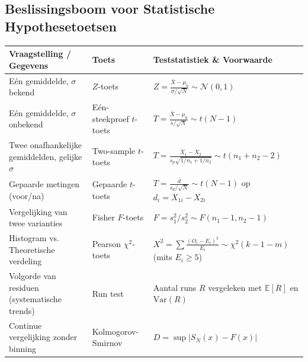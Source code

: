 \documentclass[11pt,a4paper]{article}
\newcommand{\E}{\mathbb{E}}
\newcommand{\Var}{\text{Var}}
\newcommand{\normdist}{\mathcal{N}}
\begin{document}
\subsection{Beslissingsboom voor Statistische Hypothesetoetsen}
\begin{table}[H]
    \centering
    \small
    \begin{tabularx}{\textwidth}{llX}
        \toprule
        \textbf{Vraagstelling / Gegevens} & \textbf{Toets} & \textbf{Teststatistiek \& Voorwaarde} \\
        \midrule
        Eén gemiddelde, $\sigma$ bekend & $Z$-toets & $Z = \frac{\bar{X} - \mu_0}{\sigma / \sqrt{N}} \sim \normdist(0,1)$ \\
        \addlinespace
        Eén gemiddelde, $\sigma$ onbekend & Eén-steekproef $t$-toets & $T = \frac{\bar{X} - \mu_0}{s / \sqrt{N}} \sim t(N-1)$ \\
        \addlinespace
        Twee onafhankelijke gemiddelden, gelijke $\sigma$ & Two-sample $t$-toets & $T = \frac{\bar{X}_1 - \bar{X}_2}{s_p\sqrt{1/n_1 + 1/n_2}} \sim t(n_1+n_2-2)$ \\
        \addlinespace
        Gepaarde metingen (voor/na) & Gepaarde $t$-toets & $T = \frac{\bar{d}}{s_d / \sqrt{N}} \sim t(N-1)$ op $d_i = X_{1i} - X_{2i}$ \\
        \addlinespace
        Vergelijking van twee varianties & Fisher $F$-toets & $F = s_1^2 / s_2^2 \sim F(n_1-1, n_2-1)$ \\
        \addlinespace
        Histogram vs. Theoretische verdeling & Pearson $\chi^2$-toets & $X^2 = \sum \frac{(O_i - E_i)^2}{E_i} \sim \chi^2(k - 1 - m)$ (mits $E_i \ge 5$) \\
        \addlinespace
        Volgorde van residuen (systematische trends) & Run test & Aantal runs $R$ vergeleken met $\E[R]$ en $\Var(R)$ \\
        \addlinespace
        Continue vergelijking zonder binning & Kolmogorov-Smirnov & $D = \sup |S_N(x) - F(x)|$ \\
        \bottomrule
    \end{tabularx}
\end{table}
\end{document}
